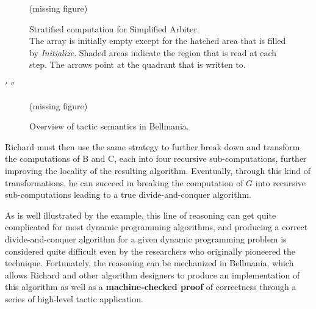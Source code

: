 \begin{figure}
\centering
\ifarmando
\bigskip(missing figure)\bigskip
\else

\fi
\caption[caption]{\label{overview:chain}
  Stratified computation for Simplified Arbiter. \\[.2em]
  The array is initially empty except for the hatched area that is
  filled by {\it Initialize}.
  Shaded areas indicate the region that is read at each step.
  The arrows point at the quadrant that is written to. }
\end{figure}

\newcommand\applytactic[1]{{\tt >} \sf #1}
\newcommand\applytacticnode[1]{\node[right,align=left] at (3,1) {\applytactic{#1}}}

\newbox\primebox
\setbox\primebox\hbox{$'$}
\newbox\doubleprimebox
\setbox\doubleprimebox\hbox{$''$}

\newcommand\primeocd[1]{\hspace{\wd\primebox}#1\usebox\primebox}
\newcommand\doubleprimeocd[1]{\hspace{\wd\doubleprimebox}#1\usebox\doubleprimebox}

\begin{figure}
\centering
\ifarmando
\bigskip(missing figure)\bigskip
\else

\vspace{-2mm}
\fi
\caption[caption]{\label{overview:slice-stratify-synth}
  Overview of tactic semantics in Bellmania. }
\end{figure}


Richard must then use the same strategy to further break down and
transform the computations of B and C, each into four recursive sub-computations, 
further improving the locality of the resulting algorithm.
Eventually, through this kind of transformations, he can succeed in breaking the computation of $G$ into recursive sub-computations leading to a true divide-and-conquer algorithm. 

As is well illustrated by the example, this line of reasoning can get quite complicated for most dynamic programming algorithms, 
and producing a correct divide-and-conquer algorithm for a given dynamic programming problem is considered quite difficult even by the researchers who originally pioneered the technique. 
Fortunately, the reasoning can be mechanized in Bellmania, which allows
Richard and other algorithm designers to produce an implementation of this algorithm
as well as a {\bf machine-checked proof} of correctness
through a series of high-level tactic application.

